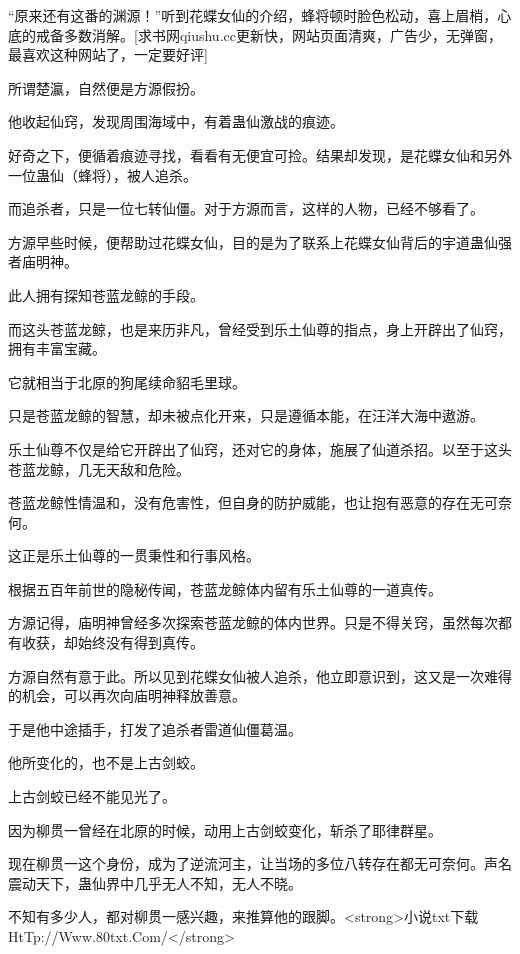 
\begin{this_body}

“原来还有这番的渊源！”听到花蝶女仙的介绍，蜂将顿时脸色松动，喜上眉梢，心底的戒备多数消解。[求书网qiushu.cc更新快，网站页面清爽，广告少，无弹窗，最喜欢这种网站了，一定要好评]

所谓楚瀛，自然便是方源假扮。

他收起仙窍，发现周围海域中，有着蛊仙激战的痕迹。

好奇之下，便循着痕迹寻找，看看有无便宜可捡。结果却发现，是花蝶女仙和另外一位蛊仙（蜂将），被人追杀。

而追杀者，只是一位七转仙僵。对于方源而言，这样的人物，已经不够看了。

方源早些时候，便帮助过花蝶女仙，目的是为了联系上花蝶女仙背后的宇道蛊仙强者庙明神。

此人拥有探知苍蓝龙鲸的手段。

而这头苍蓝龙鲸，也是来历非凡，曾经受到乐土仙尊的指点，身上开辟出了仙窍，拥有丰富宝藏。

它就相当于北原的狗尾续命貂毛里球。

只是苍蓝龙鲸的智慧，却未被点化开来，只是遵循本能，在汪洋大海中遨游。

乐土仙尊不仅是给它开辟出了仙窍，还对它的身体，施展了仙道杀招。以至于这头苍蓝龙鲸，几无天敌和危险。

苍蓝龙鲸性情温和，没有危害性，但自身的防护威能，也让抱有恶意的存在无可奈何。

这正是乐土仙尊的一贯秉性和行事风格。

根据五百年前世的隐秘传闻，苍蓝龙鲸体内留有乐土仙尊的一道真传。

方源记得，庙明神曾经多次探索苍蓝龙鲸的体内世界。只是不得关窍，虽然每次都有收获，却始终没有得到真传。

方源自然有意于此。所以见到花蝶女仙被人追杀，他立即意识到，这又是一次难得的机会，可以再次向庙明神释放善意。

于是他中途插手，打发了追杀者雷道仙僵葛温。

他所变化的，也不是上古剑蛟。

上古剑蛟已经不能见光了。

因为柳贯一曾经在北原的时候，动用上古剑蛟变化，斩杀了耶律群星。

现在柳贯一这个身份，成为了逆流河主，让当场的多位八转存在都无可奈何。声名震动天下，蛊仙界中几乎无人不知，无人不晓。

不知有多少人，都对柳贯一感兴趣，来推算他的跟脚。<strong>小说txt下载HtTp://Www.80txt.Com/</strong>


\end{this_body}
